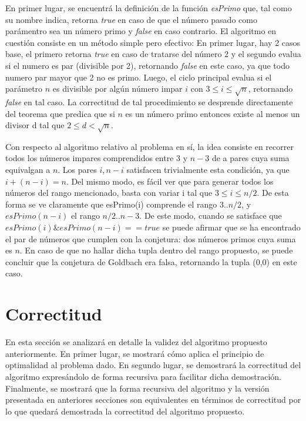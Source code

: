 \documentclass[a4paper,10pt] {article}
\begin{document}
En primer lugar, se encuentr\'a la definici\'on de la funci\'on \textit{esPrimo}
que, tal como su nombre indica, retorna \textit{true} en caso de que el n\'umero
pasado como par\'amentro sea un n\'umero primo y \textit{false} en caso
contrario. El algoritmo en cuesti\'on consiste en un m\'etodo simple pero
efectivo: En primer lugar, hay 2 casos base, el primero retorna \textit{true} en caso de
tratarse del n\'umero 2 y el segundo evalua si el numero es par (divisible por
2), retornando \textit{false} en este caso, ya que todo numero par mayor que 2
no es primo. Luego, el ciclo principal evalua si el par\'ametro $n$ es divisible
por alg\'un n\'umero impar $i$ con $3 \leq i \leq \sqrt{n}$, retornando
\textit{false} en tal caso. La correctitud de tal procedimiento se desprende
directamente del teorema que predica que si $n$ es un n\'umero primo entonces
existe al menos un divisor d tal que $2 \leq d < \sqrt{n}$.

Con respecto al algoritmo relativo al problema en s\'i, la idea consiste en
recorrer todos los n\'umeros impares comprendidos entre $3$ y $n-3$ de a pares
cuya suma equivalgan a $n$. Los pares $i, n - i$ satisfacen trivialmente esta condici\'on, ya que $i + (n-i) = n$. Del mismo modo, es f\'acil ver que para generar todos los n\'umeros del rango mencionado, basta con variar i tal que $3 \le i \le n/2$. De esta forma se ve claramente que esPrimo(i) comprende el rango $3..n/2$, y $esPrimo(n-i)$ el rango $n/2..n-3$. De este modo, cuando se satisface que $esPrimo(i) \& esPrimo(n-i) == true$ se puede afirmar que se ha encontrado el par de n\'umeros que cumplen con la conjetura: dos n\'umeros primos cuya suma es $n$. En caso de que no hallar dicha tupla dentro del rango propuesto, se puede concluir que la conjetura de Goldbach era falsa, retornando la tupla (0,0) en este caso.  

\section*{Correctitud}

En esta secci\'on se analizar\'a en detalle la validez del algoritmo propuesto anteriormente. En primer lugar, se mostrar\'a c\'omo aplica el principio de optimalidad al problema dado. En segundo lugar, se demostrar\'a la correctitud del algoritmo expres\'andolo de forma recursiva para facilitar dicha demostraci\'on. Finalmente, se mostrar\'a que la forma recursiva del algoritmo y la versi\'on presentada en anteriores secciones son equivalentes en t\'erminos de correctitud por lo que quedar\'a demostrada la correctitud del algoritmo propuesto.
  
\end{document}

